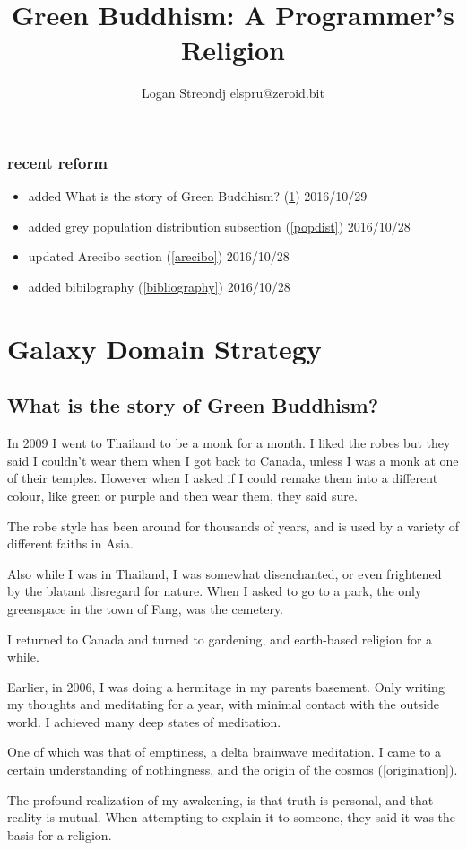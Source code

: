 \documentclass{report}
\title{Green Buddhism: A Programmer's Religion}
\author{Logan Streondj elspru@zeroid.bit}
\begin{document}
\section{recent reform}
\begin{itemize}
  \item added What is the story of Green Buddhism? (\ref{whatstory}) 2016/10/29
  \item added grey population distribution subsection (\ref{popdist})
2016/10/28
 \item updated Arecibo section (\ref{arecibo}) 2016/10/28
 \item added bibilography (\ref{bibliography}) 2016/10/28
\end{itemize}

\tableofcontents
\part{Galaxy Domain Strategy}

\chapter{What is the story of Green Buddhism?}
\label{whatstory}
In 2009 I went to Thailand to be a monk for a month. I liked the robes but they
said I couldn't wear them when I got back to Canada, unless I was a monk at one
of their temples. However when I asked if I could remake them into a different 
colour, like green or purple and then wear them, they said sure. 

The robe style has been around for thousands of years, and is used by a variety
of different faiths in Asia. 

Also while I was in Thailand, I was somewhat disenchanted, or even frightened by
the blatant disregard for nature. When I asked to go to a park, the only
greenspace in the town of Fang, was the cemetery. 

I returned to Canada and turned to gardening, and earth-based religion for a
while. 

Earlier, in 2006, I was doing a hermitage in my parents basement. Only writing
my thoughts and meditating for a year, with minimal contact with the outside
world. I achieved many deep states of meditation.  

One of which was that of emptiness, a delta brainwave meditation. 
I came to a certain understanding of nothingness, and the origin of the
cosmos (\ref{origination}).

The profound realization of my awakening, is that truth is personal, and that
reality is mutual. When attempting to explain it to someone, they said it was
the basis for a religion. 
\end{document}
